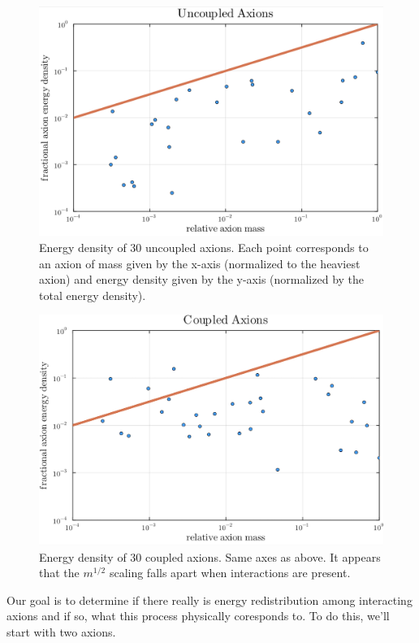 \documentclass{article}
\begin{document}
\begin{figure}[h]
    \centering
    \includegraphics[width=0.9\linewidth]{figs/Uncoupled_Axions.png}
    \caption{Energy density of 30 uncoupled axions. Each point corresponds to an axion of mass given by the x-axis (normalized to the heaviest axion) and energy density given by the y-axis (normalized by the total energy density).}
    \label{fig:e-density-uncoupled}
\end{figure}
\begin{figure}[h]
    \centering
    \includegraphics[width=0.9\linewidth]{figs/Coupled_Axions.png}
    \caption{Energy density of 30 coupled axions. Same axes as above. It appears that the $m^{1/2}$ scaling falls apart when interactions are present.}
    \label{fig:e-density-coupled}
\end{figure}

Our goal is to determine if there really is energy redistribution among interacting axions and if so, what this process physically coresponds to. To do this, we'll start with two axions.
\end{document}
